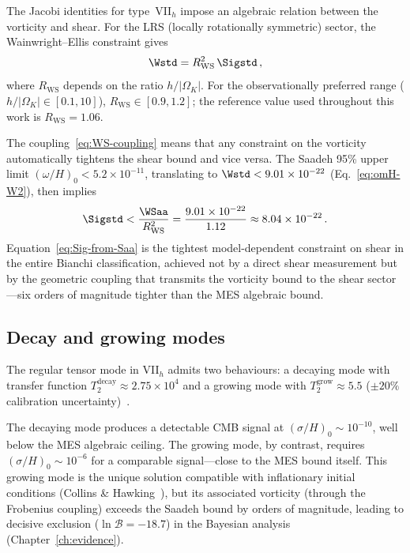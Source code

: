 The Jacobi identities for type~VII$_h$ impose an algebraic
relation between the vorticity and shear.  For the LRS
(locally rotationally symmetric) sector, the Wainwright--Ellis
constraint gives
\begin{equation}\label{eq:WS-coupling}
\Wstd = R_{\mathrm{WS}}^2\,\Sigstd\,,
\end{equation}
where $R_{\mathrm{WS}}$ depends on the ratio $h/|\Omega_K|$.
For the observationally preferred range
($h/|\Omega_K| \in [0.1, 10]$),
$R_{\mathrm{WS}} \in [0.9, 1.2]$; the reference value used
throughout this work is $R_{\mathrm{WS}} = 1.06$.

The coupling~\eqref{eq:WS-coupling} means that any constraint
on the vorticity automatically tightens the shear bound and
vice versa.  The Saadeh 95\% upper limit
$(\omega/H)_0 < 5.2 \times 10^{-11}$, translating to
$\Wstd < 9.01 \times 10^{-22}$
(Eq.~\eqref{eq:omH-W2}), then implies
\begin{equation}\label{eq:Sig-from-Saa}
\Sigstd < \frac{\WSaa}{R_{\mathrm{WS}}^2}
= \frac{9.01 \times 10^{-22}}{1.12}
\approx 8.04 \times 10^{-22}\,.
\end{equation}
Equation~\eqref{eq:Sig-from-Saa} is the tightest model-dependent constraint on shear in
the entire Bianchi classification, achieved not by a direct
shear measurement but by the geometric coupling that transmits
the vorticity bound to the shear sector---six orders of
magnitude tighter than the MES algebraic bound.


\subsection{Decay and growing modes}\label{sec:VIIh-modes}

The regular tensor mode in VII$_h$ admits two behaviours: a
decaying mode with transfer function
$T_2^{\mathrm{decay}} \approx 2.75 \times 10^4$ and a growing
mode with $T_2^{\mathrm{grow}} \approx 5.5$
($\pm 20\%$ calibration
uncertainty)~\cite{Saadeh2016b,Pontzen2011}.

The decaying mode produces a detectable CMB signal at
$(\sigma/H)_0 \sim 10^{-10}$, well below the MES algebraic
ceiling.  The growing mode, by contrast, requires
$(\sigma/H)_0 \sim 10^{-6}$ for a comparable signal---close
to the MES bound itself.  This growing mode is the unique
solution compatible with inflationary initial conditions
(Collins \& Hawking~\cite{CollinsHawking1973}), but its
associated vorticity (through the Frobenius coupling) exceeds
the Saadeh bound by orders of magnitude, leading to decisive
exclusion ($\ln\mathcal{B} = -18.7$) in the Bayesian analysis
(Chapter~\ref{ch:evidence}).

